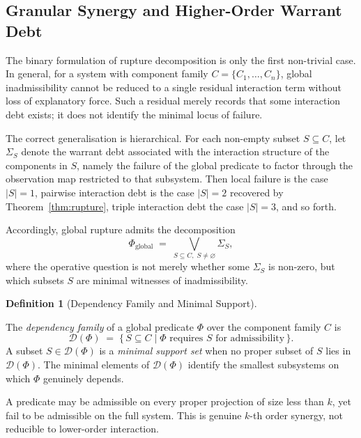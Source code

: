 \documentclass[12pt]{article}
\theoremstyle{plain}
\theoremstyle{definition}
\newtheorem{definition}[theorem]{Definition}
\theoremstyle{remark}
\begin{document}
\subsection{Granular Synergy and Higher-Order Warrant Debt}
\label{subsec:higher-order}

The binary formulation of rupture decomposition is only the first
non-trivial case.
In general, for a system with component family
$
C = \{C_1,\dots,C_n\}
$,
global inadmissibility cannot be reduced to a single residual
interaction term without loss of explanatory force.
Such a residual merely records that some interaction debt exists; it
does not identify the minimal locus of failure.

The correct generalisation is hierarchical.
For each non-empty subset
$
S \subseteq C
$,
let
$
\Sigma_S
$
denote the warrant debt associated with the interaction structure of
the components in $S$, namely the failure of the global predicate to
factor through the observation map restricted to that subsystem.
Then local failure is the case $|S| = 1$, pairwise interaction debt
is the case $|S| = 2$ recovered by Theorem~\ref{thm:rupture}, triple
interaction debt the case $|S| = 3$, and so forth.

Accordingly, global rupture admits the decomposition
\[
\Phi_{\mathrm{global}}
\;=\;
\bigvee_{S \subseteq C,\; S \neq \varnothing}
\Sigma_S,
\]
where the operative question is not merely whether some
$
\Sigma_S
$
is non-zero, but which subsets $S$ are minimal witnesses of
inadmissibility.

\begin{definition}[Dependency Family and Minimal Support]
\label{def:dependency-family}

The \emph{dependency family} of a global predicate $\Phi$ over the
component family $C$ is
\[
\mathcal{D}(\Phi)
\;=\;
\{\,S \subseteq C
\mid
\Phi \text{ requires } S \text{ for admissibility}\,\}.
\]
A subset $S \in \mathcal{D}(\Phi)$ is a \emph{minimal support set}
when no proper subset of $S$ lies in $\mathcal{D}(\Phi)$.
The minimal elements of $\mathcal{D}(\Phi)$ identify the smallest
subsystems on which $\Phi$ genuinely depends.

\end{definition}

A predicate may be admissible on every proper projection of size less
than $k$, yet fail to be admissible on the full system.
This is genuine $k$-th order synergy, not reducible to lower-order
interaction.
\end{document}
